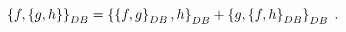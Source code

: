 \begin{equation}
\left\{  f,\left\{  g,h\right\}  \right\}  _{{\footnotesize DB}}=\left\{
\left\{  f,g\right\}  _{{\footnotesize DB}},h\right\}  _{{\footnotesize DB}%
}+\left\{  g,\left\{  f,h\right\}  _{{\footnotesize DB}}\right\}
_{{\footnotesize DB}}\;. \label{DBDerivation}%
\end{equation}

